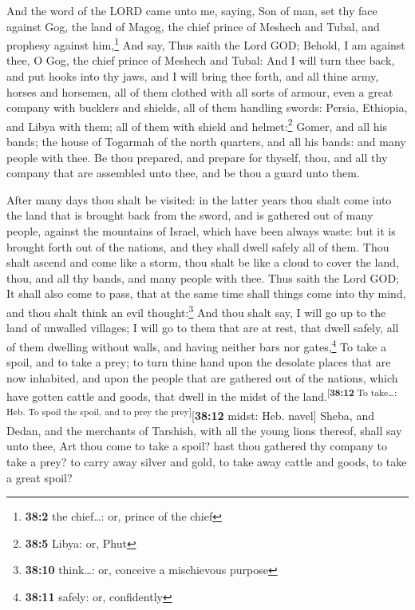  And the word of the LORD came unto me, saying,
 Son of man, set thy face against Gog, the land of Magog,
the chief prince of Meshech and Tubal, and prophesy against
him,\footnote{\textbf{38:2} the chief\ldots: or, prince of the chief}
 And say, Thus saith the Lord GOD; Behold, I am against
thee, O Gog, the chief prince of Meshech and Tubal:  And I
will turn thee back, and put hooks into thy jaws, and I will bring thee
forth, and all thine army, horses and horsemen, all of them clothed with
all sorts of armour, even a great company with bucklers and shields, all
of them handling swords:  Persia, Ethiopia, and Libya with
them; all of them with shield and helmet:\footnote{\textbf{38:5} Libya:
  or, Phut}  Gomer, and all his bands; the house of
Togarmah of the north quarters, and all his bands: and many people with
thee.  Be thou prepared, and prepare for thyself, thou,
and all thy company that are assembled unto thee, and be thou a guard
unto them.

 After many days thou shalt be visited: in the latter
years thou shalt come into the land that is brought back from the sword,
and is gathered out of many people, against the mountains of Israel,
which have been always waste: but it is brought forth out of the
nations, and they shall dwell safely all of them.  Thou
shalt ascend and come like a storm, thou shalt be like a cloud to cover
the land, thou, and all thy bands, and many people with thee.
 Thus saith the Lord GOD; It shall also come to pass,
that at the same time shall things come into thy mind, and thou shalt
think an evil thought:\footnote{\textbf{38:10} think\ldots: or, conceive
  a mischievous purpose}  And thou shalt say, I will go
up to the land of unwalled villages; I will go to them that are at rest,
that dwell safely, all of them dwelling without walls, and having
neither bars nor gates,\footnote{\textbf{38:11} safely: or, confidently}
 To take a spoil, and to take a prey; to turn thine hand
upon the desolate places that are now inhabited, and upon the people
that are gathered out of the nations, which have gotten cattle and
goods, that dwell in the midst of the
land.\textsuperscript{{[}\textbf{38:12} To take\ldots: Heb. To spoil the
spoil, and to prey the prey{]}}{[}\textbf{38:12} midst: Heb. navel{]}
 Sheba, and Dedan, and the merchants of Tarshish, with
all the young lions thereof, shall say unto thee, Art thou come to take
a spoil? hast thou gathered thy company to take a prey? to carry away
silver and gold, to take away cattle and goods, to take a great spoil?

